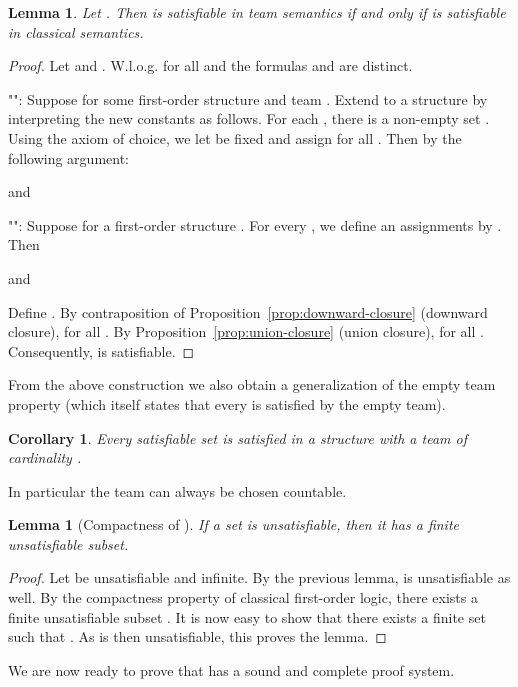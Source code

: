 \documentclass[a4paper,english,fleqn,11pt,final]{scrartcl}
\makeatletter
\newcommand{\Wloss}{W.l.o.g.\@\xspace}
\theoremstyle{plain}
\newtheorem{lemma}[theorem]{Lemma}
\newtheorem{corollary}[theorem]{Corollary}
\theoremstyle{definition}
\makeatother
\begin{document}
\begin{lemma}
Let . Then  is satisfiable in team semantics if and only if  is satisfiable in classical semantics.
\end{lemma}
\begin{proof}

Let  and .
\Wloss for all  and  the formulas  and  are distinct.

"":
Suppose  for some first-order structure  and team .
Extend  to a structure  by interpreting the new constants as follows.
For each , there is a non-empty set .
Using the axiom of choice, we let  be fixed and assign  for all .
Then  by the following argument:

and


\medskip

"": Suppose  for a first-order structure .
For every , we define an assignments  by .
Then

and


Define .
By contraposition of Proposition~\ref{prop:downward-closure} (downward closure),  for all .
By Proposition~\ref{prop:union-closure} (union closure),  for all .
Consequently,  is satisfiable.
\end{proof}

From the above construction we also obtain a generalization of the empty team property (which itself states that every  is satisfied by the empty team).

\begin{corollary}
Every satisfiable set  is satisfied in a structure with a team of cardinality .
\end{corollary}

In particular the team can always be chosen countable.

\begin{lemma}[Compactness of ]
	If a set  is unsatisfiable, then it has a finite unsatisfiable subset.
\end{lemma}
\begin{proof}
Let  be unsatisfiable and infinite.
By the previous lemma,  is unsatisfiable as well.
By the compactness property of classical first-order logic, there exists a finite unsatisfiable subset .
It is now easy to show that there exists a finite set  such that .
As  is then unsatisfiable, this proves the lemma.
\end{proof}


We are now ready to prove that  has a sound and complete proof system.
\end{document}
